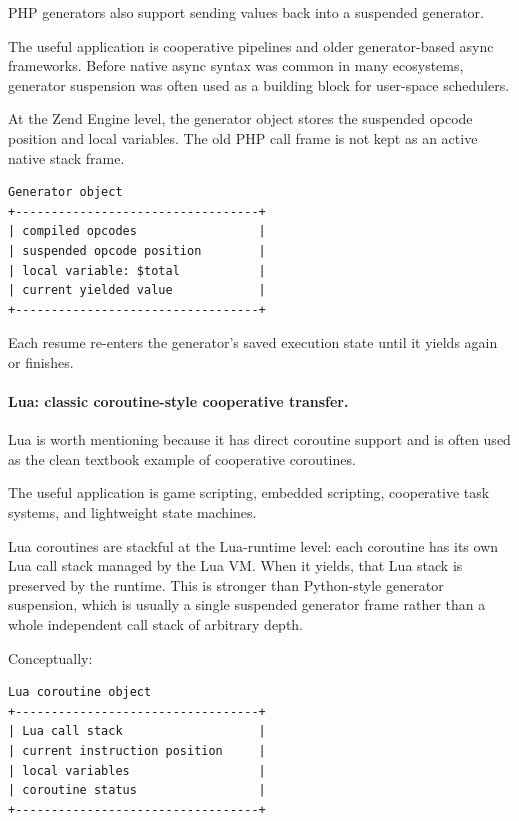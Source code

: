 PHP generators also support sending values back into a suspended generator.

The useful application is cooperative pipelines and older generator-based async frameworks. Before native async syntax was common in many ecosystems, generator suspension was often used as a building block for user-space schedulers.

At the Zend Engine level, the generator object stores the suspended opcode position and local variables. The old PHP call frame is not kept as an active native stack frame.

\begin{verbatim}
Generator object
+----------------------------------+
| compiled opcodes                 |
| suspended opcode position        |
| local variable: $total           |
| current yielded value            |
+----------------------------------+
\end{verbatim}

Each resume re-enters the generator's saved execution state until it yields again or finishes.

\paragraph{Lua: classic coroutine-style cooperative transfer.}

Lua is worth mentioning because it has direct coroutine support and is often used as the clean textbook example of cooperative coroutines.

The useful application is game scripting, embedded scripting, cooperative task systems, and lightweight state machines.

Lua coroutines are stackful at the Lua-runtime level: each coroutine has its own Lua call stack managed by the Lua VM. When it yields, that Lua stack is preserved by the runtime. This is stronger than Python-style generator suspension, which is usually a single suspended generator frame rather than a whole independent call stack of arbitrary depth.

Conceptually:

\begin{verbatim}
Lua coroutine object
+----------------------------------+
| Lua call stack                   |
| current instruction position     |
| local variables                  |
| coroutine status                 |
+----------------------------------+
\end{verbatim}


